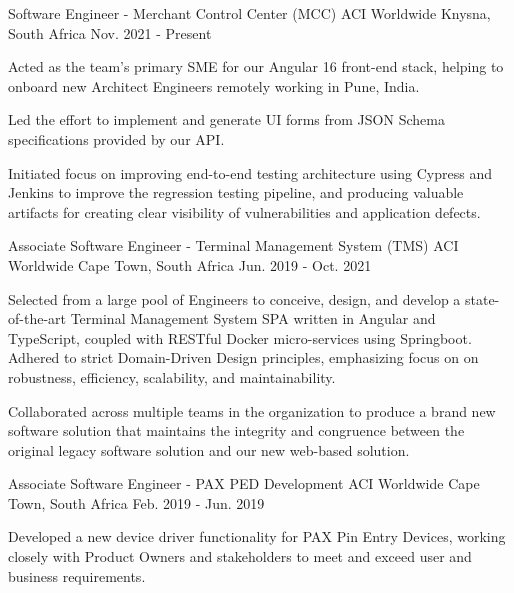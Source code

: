
\begin{cventries}
  \cventry
    {Software Engineer - Merchant Control Center (MCC)}
    {ACI Worldwide}
    {Knysna, South Africa}
    {Nov. 2021 - Present}
    {
      \begin{cvitems}
        \item {Acted as the team's primary SME for our Angular 16 front-end stack, helping to onboard new Architect Engineers remotely working in Pune, India.}
        \item {Led the effort to implement and generate UI forms from JSON Schema specifications provided by our API.}
        \item {Initiated focus on improving end-to-end testing architecture using Cypress and Jenkins to improve the regression testing pipeline, and producing valuable artifacts for creating clear visibility of vulnerabilities and application defects.}
      \end{cvitems}
    }
    
  \cventry
    {Associate Software Engineer - Terminal Management System (TMS)}
    {ACI Worldwide}
    {Cape Town, South Africa}
    {Jun. 2019 - Oct. 2021}
    {
      \begin{cvitems}
        \item {Selected from a large pool of Engineers to conceive, design, and develop a state-of-the-art Terminal Management System SPA written in Angular and TypeScript, coupled with RESTful Docker micro-services using Springboot.
Adhered to strict Domain-Driven Design principles, emphasizing focus on on robustness, efficiency, scalability, and maintainability.}
        \item {Collaborated across multiple teams in the organization to produce a brand new software solution that maintains the integrity and congruence between the original legacy software solution and our new web-based solution.}
      \end{cvitems}
    }
    
  \cventry
    {Associate Software Engineer - PAX PED Development} %
    {ACI Worldwide} %
    {Cape Town, South Africa} %
    {Feb. 2019 - Jun. 2019} %
    {
      \begin{cvitems} %
        \item {Developed a new device driver functionality for PAX Pin Entry Devices, working closely with Product Owners and stakeholders to meet and exceed user and business requirements.}
      \end{cvitems}
    }
    
\end{cventries}
